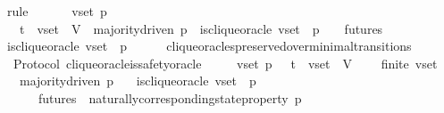 \begin{isabellebody}
\ {\isacharparenleft}rule{\isacharplus}{\isacharparenright}\isanewline
{}\isamarkupfalse%
\ {\isacharminus}\isanewline
\ \ \isamarkupfalse%
\ {\isasymsigma}\ v{\isacharunderscore}set\ p\ {\isasymsigma}{\isacharprime}\isanewline
\ \ \isamarkupfalse%
\ {\isachardoublequoteopen}{\isasymsigma}\ {\isasymin}\ {\isasymSigma}t\ {\isasymand}\ v{\isacharunderscore}set\ {\isasymsubseteq}\ V{\isachardoublequoteclose}\ \ {\isachardoublequoteopen}majority{\isacharunderscore}driven\ p{\isachardoublequoteclose}\ \ {\isachardoublequoteopen}is{\isacharunderscore}clique{\isacharunderscore}oracle\ {\isacharparenleft}v{\isacharunderscore}set{\isacharcomma}\ {\isasymsigma}{\isacharcomma}\ p{\isacharparenright}{\isachardoublequoteclose}\ \ {\isachardoublequoteopen}{\isasymsigma}{\isacharprime}\ {\isasymin}\ futures\ {\isasymsigma}{\isachardoublequoteclose}\ \isanewline
\ \ \isamarkupfalse%
\ {\isachardoublequoteopen}is{\isacharunderscore}clique{\isacharunderscore}oracle\ {\isacharparenleft}v{\isacharunderscore}set{\isacharcomma}\ {\isasymsigma}{\isacharprime}{\isacharcomma}\ p{\isacharparenright}{\isachardoublequoteclose}\isanewline
\ \ \ \ \isamarkupfalse%
\ clique{\isacharunderscore}oracles{\isacharunderscore}preserved{\isacharunderscore}over{\isacharunderscore}minimal{\isacharunderscore}transitions\isanewline
\ \ \isamarkupfalse%
\isanewline
{}\isamarkupfalse%
%
\endisatagproof
{\isafoldproof}%
%
\isadelimproof
\isanewline
%
\endisadelimproof
\isanewline
\isanewline
{}\isamarkupfalse%
\ {\isacharparenleft}\ Protocol{\isacharparenright}\ clique{\isacharunderscore}oracle{\isacharunderscore}is{\isacharunderscore}safety{\isacharunderscore}oracle\ {\isacharcolon}\isanewline
\ \ {\isachardoublequoteopen}{\isasymforall}\ {\isasymsigma}\ v{\isacharunderscore}set\ p{\isachardot}\ {\isasymsigma}\ {\isasymin}\ {\isasymSigma}t\ {\isasymand}\ v{\isacharunderscore}set\ {\isasymsubseteq}\ V\ \isanewline
\ \ {\isasymlongrightarrow}\ finite\ v{\isacharunderscore}set\isanewline
\ \ {\isasymlongrightarrow}\ majority{\isacharunderscore}driven\ p\isanewline
\ \ {\isasymlongrightarrow}\ is{\isacharunderscore}clique{\isacharunderscore}oracle\ {\isacharparenleft}v{\isacharunderscore}set{\isacharcomma}\ {\isasymsigma}{\isacharcomma}\ p{\isacharparenright}\ \isanewline
\ \ {\isasymlongrightarrow}\ {\isacharparenleft}{\isasymforall}\ {\isasymsigma}{\isacharprime}\ {\isasymin}\ futures\ {\isasymsigma}{\isachardot}\ naturally{\isacharunderscore}corresponding{\isacharunderscore}state{\isacharunderscore}property\ p\ {\isasymsigma}{\isacharprime}{\isacharparenright}{\isachardoublequoteclose}\ \ \ \ \isanewline

\end{isabellebody}
